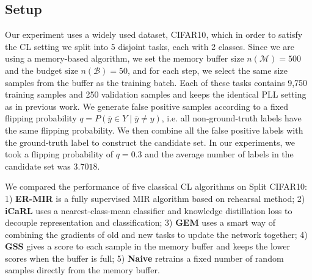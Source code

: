 \documentclass{article} %
\begin{document}
\subsection{Setup}
Our experiment uses a widely used dataset, CIFAR10\citep{AlexKrizhevsky2009LearningML}, which in order to satisfy the CL setting we split into 5 disjoint tasks, each with 2 classes\citep{RahafAljundi2019OnlineCL}. 
Since we are using a memory-based algorithm, we set the memory buffer size $n(\mathcal{M}) = 500$ and the budget size $n(\mathcal{B}) = 50$, and for each step, we select the same size samples from the buffer as the training batch.
Each of these tasks contains 9,750 training samples and 250 validation samples and keeps the identical PLL setting as in previous work\citep{HongweiWen2021LeveragedWL}.
We generate false positive samples according to a fixed flipping probability $q = P(\bar{y} \in Y \mid \bar{y} \ne y)$, i.e. all non-ground-truth labels have the same flipping probability.
We then combine all the false positive labels with the ground-truth label to construct the candidate set.
In our experiments, we took a flipping probability of $q = 0.3$ and the average number of labels in the candidate set was $3.7018$.

We compared the performance of five classical CL algorithms on Split CIFAR10:
1) \textbf{ER-MIR}\citep{MIR} is a fully supervised MIR algorithm based on rehearsal method;
2) \textbf{iCaRL}\citep{GTSperl2016iCaRLIC} uses a nearest-class-mean classifier and knowledge distillation loss to decouple representation and classification;
3) \textbf{GEM}\citep{DavidLopezPaz2017GradientEM} uses a smart way of combining the gradients of old and new tasks to update the network together;
4) \textbf{GSS}\citep{RahafAljundi2019GradientBS} gives a score to each sample in the memory buffer and keeps the lower scores when the buffer is full;
5) \textbf{Naive} retrains a fixed number of random samples directly from the memory buffer.
\end{document}
